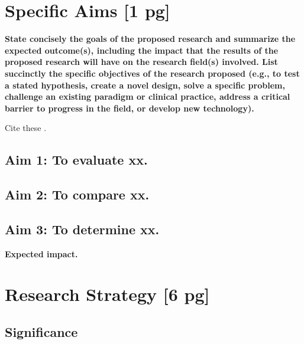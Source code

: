 \documentclass[11pt]{article}
\begin{document}
\section*{Specific Aims [1 pg]}

\textbf{State concisely the goals of the proposed research and summarize the expected outcome(s),
including the impact that the results of the proposed research will have on the research field(s)
involved.
List succinctly the specific objectives of the research proposed (e.g., to test a stated hypothesis,
create a novel design, solve a specific problem, challenge an existing paradigm or clinical practice,
address a critical barrier to progress in the field, or develop new technology).}

Cite these \cite{einstein, knuthwebsite, latexcompanion}.
\lipsum[71-72]

\vspace{1mm}
\subsection*{Aim 1: \hspace*{10pt} To evaluate xx.}
\vspace{1mm}
\subsection*{Aim 2:  \hspace*{10pt} To compare xx.}
\vspace{1mm}
\subsection*{Aim 3:  \hspace*{10pt} To determine xx.}
\vspace{3mm}

 \lipsum[74-76]

\textbf{Expected impact.}
\lipsum[77]

\newpage
\section*{Research Strategy [6 pg]}

\subsection*{Significance}
\end{document}

